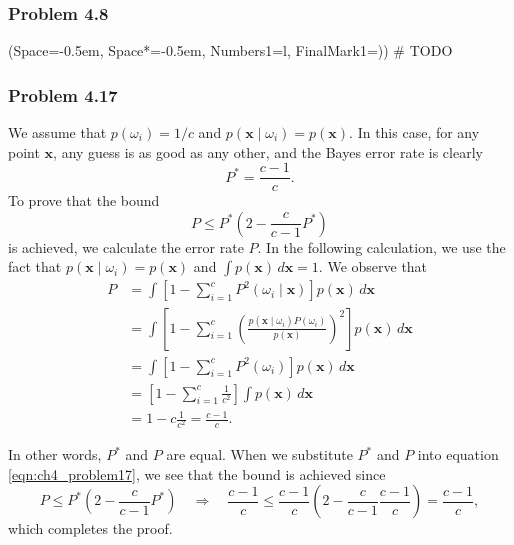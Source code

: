 \documentclass[12pt, a4paper]{article}
\newcommand{\listSpace}{-0.5em}%
\newcommand{\vect}[1]{\bm{#1}}
\begin{document}
\subsubsection*{Problem 4.8}
\begin{easylist}[enumerate]
\ListProperties(Space=\listSpace, Space*=\listSpace, Numbers1=l, FinalMark1={)})
# TODO

\end{easylist}


\subsubsection*{Problem 4.17}
We assume that $p(\omega_i) = 1/ c$ and $p(\vect{x} \mid \omega_i) = p(\vect{x})$.
In this case, for any point $\vect{x}$, any guess is as good as any other, and the Bayes error rate is clearly
\begin{equation*}
	P^* = \frac{c-1}{c}.
\end{equation*}
To prove that the bound
\begin{equation}
\label{eqn:ch4_problem17}
	P \leq P^* \left( 2 - \frac{c}{c - 1}P^* \right)
\end{equation}
is achieved, we calculate the error rate $P$.
In the following calculation, we use the fact that $p(\vect{x} \mid \omega_i) = p(\vect{x})$ and $\int p( \vect{x}) \, d\vect{x} = 1$.
We observe that
\begin{align*}
	P &= \int \left[ 1 - \sum_{i=1}^{c} P^2 \left( \omega_i \mid \vect{x} \right) \right] p( \vect{x}) \, d\vect{x} \\
	&= \int \left[ 1 - \sum_{i=1}^{c}  \left( \frac{p(\vect{x} \mid \omega_i) P( \omega_i) }{p(\vect{x})} \right)^2 \right] p( \vect{x}) \, d\vect{x} \\
	&= \int \left[ 1 - \sum_{i=1}^{c} P^2( \omega_i) \right] p( \vect{x}) \, d\vect{x} \\
	&= \left[ 1 - \sum_{i=1}^{c} \frac{1}{c^2} \right]  \int  p( \vect{x}) \, d\vect{x} \\
	&= 1 - c \frac{1}{c^2} = \frac{c-1}{c}.
\end{align*}

In other words, $P^*$ and $P$ are equal. 
When we substitute $P^*$ and $P$ into equation \eqref{eqn:ch4_problem17}, we see that the bound is achieved since 
\begin{equation*}
	P \leq P^* \left( 2 - \frac{c}{c - 1}P^* \right) 
	\quad  \Rightarrow \quad
	\frac{c-1}{c} \leq \frac{c-1}{c} \left( 2 - \frac{c}{c-1} \frac{c-1}{c}  \right) = \frac{c-1}{c},
\end{equation*}
which completes the proof.
\end{document}
